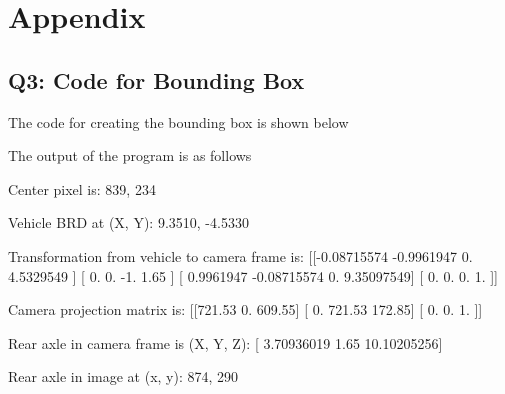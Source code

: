 
\section{Appendix}

\subsection{Q3: Code for Bounding Box}
\label{app:q3-code}

The code for creating the bounding box is shown below



The output of the program is as follows

\begin{displayquote}
    Center pixel is: 839, 234

    Vehicle BRD at (X, Y): 9.3510, -4.5330

    Transformation from vehicle to camera frame is: 
    [[-0.08715574 -0.9961947   0.          4.5329549 ]
    [ 0.          0.         -1.          1.65      ]
    [ 0.9961947  -0.08715574  0.          9.35097549]
    [ 0.          0.          0.          1.        ]]

    Camera projection matrix is:
    [[721.53   0.   609.55]
    [  0.   721.53 172.85]
    [  0.     0.     1.  ]]

    Rear axle in camera frame is (X, Y, Z): [ 3.70936019  1.65       10.10205256]

    Rear axle in image at (x, y): 874, 290
\end{displayquote}
